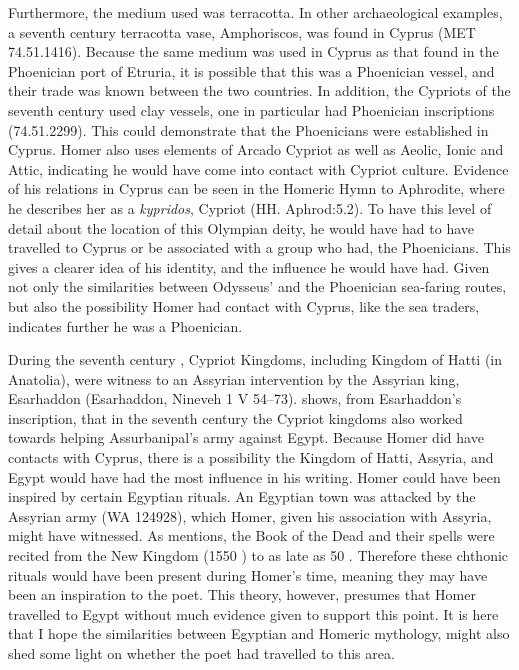 	Furthermore, the medium used was terracotta. In other archaeological examples, a seventh century \BC terracotta vase, Amphoriscos, was found in Cyprus (MET 74.51.1416). Because the same medium was used in Cyprus as that found in the Phoenician port of Etruria, it is possible that this was a Phoenician vessel, and their trade was known between the two countries. In addition, the Cypriots of the seventh century \BC used clay vessels, one in particular had Phoenician inscriptions (74.51.2299). This could demonstrate that the Phoenicians were established in Cyprus.  Homer also uses elements of Arcado Cypriot \parencite{Willmott2007} as well as Aeolic, Ionic and Attic, indicating he would have come into contact with Cypriot culture. Evidence of his relations in Cyprus can be seen in the Homeric Hymn to Aphrodite, where he describes her as a \emph{kypridos}, Cypriot (HH. Aphrod:5.2). To have this level of detail about the location of this Olympian deity, he would have had to have travelled to Cyprus or be associated with a group who had, the Phoenicians.  This gives a clearer idea of his identity, and the influence he would have had. Given not only the similarities between Odysseus’ and the Phoenician sea-faring routes, but also the possibility Homer had contact with Cyprus, like the sea traders, indicates further he was a Phoenician.
	
	During the seventh century \BC, Cypriot Kingdoms, including Kingdom of Hatti (in Anatolia), were witness to an Assyrian intervention by the Assyrian king, Esarhaddon (Esarhaddon, Nineveh 1 V 54–73). \textcite{Radner2012} shows, from Esarhaddon’s inscription, that in the seventh century the Cypriot kingdoms also worked towards helping Assurbanipal’s army against Egypt.  Because Homer did have contacts with Cyprus, there is a possibility the Kingdom of Hatti, Assyria, and Egypt would have had the most influence in his writing. Homer could have been inspired by certain Egyptian rituals. An Egyptian town was attacked by the Assyrian army (WA 124928), which Homer, given his association with Assyria, might have witnessed. As \textcite[54]{Taylor2010} mentions, the Book of the Dead and their spells were recited from the New Kingdom (1550 \BC) to as late as 50 \BC. Therefore these chthonic rituals would have been present during Homer’s time, meaning they may have been an inspiration to the poet. This theory, however, presumes that Homer travelled to Egypt without much evidence given to support this point. It is here that I hope the similarities between Egyptian and Homeric mythology, might also shed some light on whether the poet had travelled to this area.
	
